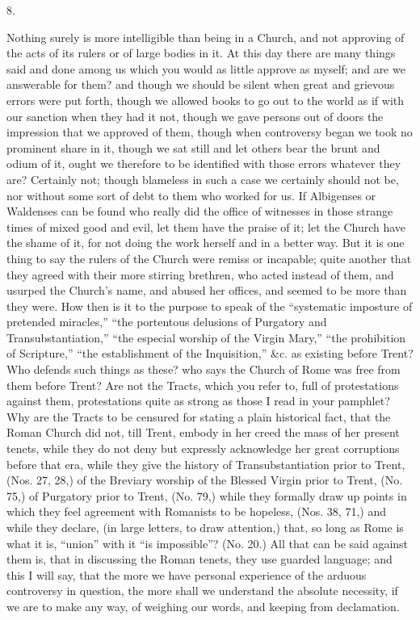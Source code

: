 8.

Nothing surely is more intelligible than being in
a Church, and not approving of the acts of its rulers or of large
bodies in it. At this day there are many things said and done among us
which you would as little approve as myself; and are we answerable for
them? and though we should be silent when great and grievous errors
were put forth, though we allowed books to go out to the world as if
with our sanction when they had it not, though we gave persons out of
doors the impression that we approved of them, though when controversy
began we took no prominent share in it, though we sat still and let
others bear the brunt and odium of it, ought we therefore to be
identified with those errors whatever they are? Certainly not; though
blameless in such a case we certainly should not be, nor without some
sort of debt to them who worked for us. If Albigenses or Waldenses can
be found who really did the office of witnesses in those strange times
of mixed good and evil, let them have the praise of it; let the Church
have the shame of it, for not doing the work herself and in a better
way. But it is one thing to say the rulers of the Church were remiss
or incapable; quite another that they agreed with their more stirring
brethren, who acted instead of them, and usurped the Church's name,
and abused her offices, and seemed to be more than they were. How then
is it to the purpose to speak of the ``systematic imposture of
pretended miracles,'' ``the portentous delusions of Purgatory and
Transubstantiation,'' ``the especial worship of the Virgin Mary,'' ``the prohibition of Scripture,''
``the establishment of the
Inquisition,'' \&c. as existing before Trent? Who defends such
things as these? who says the Church of Rome was free from them before
Trent? Are not the Tracts, which you refer to, full of protestations
against them, protestations quite as strong as those I read in
your pamphlet? Why are the Tracts to be censured for stating a plain
historical fact, that the Roman Church did not, till Trent, embody in
her creed the mass of her present tenets, while they do not deny but
expressly acknowledge her great corruptions before that era, while
they give the history of Transubstantiation prior to Trent, (Nos. 27,
28,) of the Breviary worship of the Blessed Virgin prior to Trent,
(No. 75,) of Purgatory prior to Trent, (No. 79,) while they formally
draw up points in which they feel agreement with Romanists to be
hopeless, (Nos. 38, 71,) and while they declare, (in large letters, to
draw attention,) that, so long as Rome is what it is, ``union'' with
it ``is impossible''? (No. 20.) All that can be said against them
is, that in discussing the Roman tenets, they use guarded language;
and this I will say, that the more we have personal experience of the
arduous controversy in question, the more shall we understand the
absolute necessity, if we are to make any way, of weighing our words,
and keeping from declamation.

